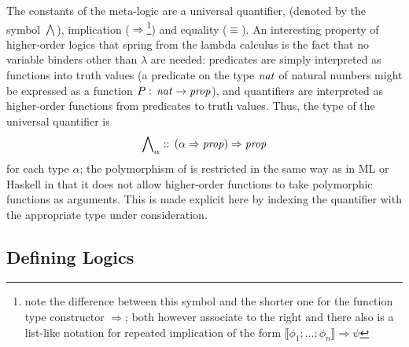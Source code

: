 The constants of the meta-logic are a universal quantifier, (denoted by the
symbol $\bigwedge$), implication ($\Longrightarrow$\footnote{note the difference between this symbol
  and the shorter one for the function type constructor $\Rightarrow$; both however
  associate to the right and there also is a list-like notation for repeated
  implication of the form $\llbracket\phi_1;\ldots;\phi_n\rrbracket \Longrightarrow \psi$}) and equality ($\equiv$). An interesting
property of higher-order logics that spring from the lambda calculus is the fact
that no variable binders other than $\lambda$ are needed: predicates are simply
interpreted as functions into truth values (\EG a predicate on the type
$\mathit{nat}$ of natural numbers might be expressed as a function $P
:\, \mathit{nat} \to \mathit{prop}$), and quantifiers are interpreted as higher-order
functions from predicates to truth values. Thus, the type of the universal
quantifier is
\begin{equation}
  \label{eq:univ-quant-type}
  \bigwedge\nolimits_\alpha ::\, (\alpha \Rightarrow \mathit{prop}) \Rightarrow \mathit{prop}
\end{equation}
for each type $\alpha$; the polymorphism of \Isabelle is restricted in the same way
as in ML or Haskell in that it does not allow higher-order functions to take
polymorphic functions as arguments. This is made explicit here by indexing the
quantifier with the appropriate type under consideration.


\subsection{Defining Logics}
\label{sec:defining-logics}

